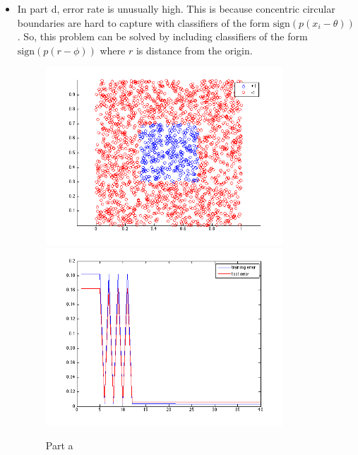 \documentclass[11pt]{article}
\begin{document}
\begin{itemize}
	\item In part d, error rate is unusually high. This is because concentric circular boundaries are hard to capture with classifiers of the form $\textrm{sign}(p(x_i - \theta))$. So, this problem can be solved by including classifiers of the form $\textrm{sign}(p(r - \phi))$ where $r$ is distance from the origin.
		\begin{figure}[h]
			\centering
			\includegraphics[width=3.5in]{part_a_scatter.png}
			\includegraphics[width=3.5in]{part_a.png}
			\caption{Part a}
		\end{figure}
		

\end{itemize}
\end{document}
